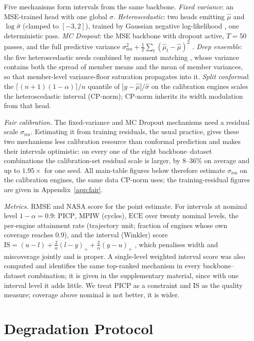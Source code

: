 \documentclass[journal]{IEEEtran}
\newcommand{\muh}{\hat{\mu}}\newcommand{\sigh}{\hat{\sigma}}
\newcommand{\PICP}{\mathrm{PICP}}\newcommand{\MPIW}{\mathrm{MPIW}}\newcommand{\ECE}{\mathrm{ECE}}
\newcommand{\IS}{\mathrm{IS}}\newcommand{\WIS}{\mathrm{WIS}}\newcommand{\foob}{f_{\mathrm{oob}}}
\begin{document}
Five mechanisms form intervals from the same backbone. \emph{Fixed variance}: an MSE-trained head with one global $\sigma$. \emph{Heteroscedastic}: two heads emitting $\muh$ and $\log\sigh$ (clamped to $[-3,2]$), trained by Gaussian negative log-likelihood \cite{nix1994}, one deterministic pass. \emph{MC Dropout}: the MSE backbone with dropout active, $T=50$ passes, and the full predictive variance $\sigma^2_{\mathrm{res}}+\frac1T\sum_t(\muh_t-\muh)^2$ \cite{kendall2017}. \emph{Deep ensemble}: the five heteroscedastic seeds combined by moment matching \cite{lakshminarayanan2017}, whose variance contains both the spread of member means and the mean of member variances, so that member-level variance-floor saturation propagates into it. \emph{Split conformal}: the $\lceil(n+1)(1-\alpha)\rceil/n$ quantile of $|y-\muh|/\sigh$ on the calibration engines scales the heteroscedastic interval (CP-norm); CP-norm inherits its width modulation from that head.

\emph{Fair calibration.} The fixed-variance and MC Dropout mechanisms need a residual scale $\sigma_{\mathrm{res}}$. Estimating it from training residuals, the usual practice, gives these two mechanisms less calibration resource than conformal prediction and makes their intervals optimistic: on every one of the eight backbone--dataset combinations the calibration-set residual scale is larger, by 8--36\% on average and up to $1.95\times$ for one seed. All main-table figures below therefore estimate $\sigma_{\mathrm{res}}$ on the calibration engines, the same data CP-norm uses; the training-residual figures are given in Appendix~\ref{app:fair}.

\emph{Metrics.} RMSE and NASA score \cite{saxena2008} for the point estimate. For intervals at nominal level $1-\alpha=0.9$: $\PICP$, $\MPIW$ (cycles), $\ECE$ over twenty nominal levels, the per-engine attainment rate (trajectory unit; fraction of engines whose own coverage reaches 0.9), and the interval (Winkler) score $\IS=(u-l)+\frac{2}{\alpha}(l-y)_++\frac{2}{\alpha}(y-u)_+$ \cite{gneiting2007}, which penalises width and miscoverage jointly and is proper. A single-level weighted interval score was also computed and identifies the same top-ranked mechanism in every backbone--dataset combination; it is given in the supplementary material, since with one interval level it adds little. We treat $\PICP$ as a constraint and $\IS$ as the quality measure; coverage above nominal is not better, it is wider.

\section{Degradation Protocol}
\label{sec:degradation}
\end{document}
